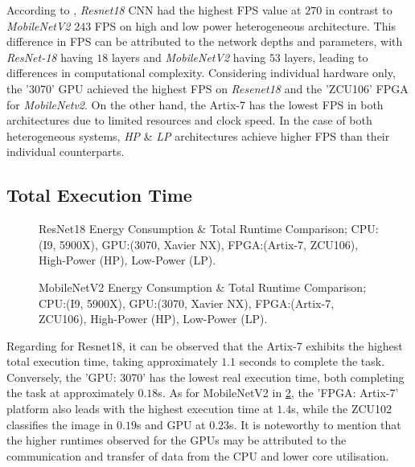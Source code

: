According to , \textit{Resnet18} CNN had the highest FPS value at $270$ in contrast to \textit{MobileNetV2} $243$ FPS on high and low power heterogeneous architecture. This difference in FPS can be attributed to the network depths and parameters, with \textit{ResNet-18} having $18$ layers and \textit{MobileNetV2} having $53$ layers, leading to differences in computational complexity. Considering individual hardware only, the '3070' GPU achieved the highest FPS on \textit{Resenet18} and the 'ZCU106' FPGA  for \textit{MobileNetv2}. On the other hand, the Artix-7 has the lowest FPS in both architectures due to limited resources and clock speed. In the case of both heterogeneous systems, \textit{HP} \& \textit{LP} architectures achieve higher FPS than their individual counterparts. 



\subsection{Total Execution Time}

\begin{figure}[t]
    \centering
\resizebox{0.9\columnwidth}{!}{}    
    \caption[ResNet18 Energy Consumption]{{ResNet18 Energy Consumption \& Total Runtime Comparison; CPU:(I9, 5900X), GPU:(3070, Xavier NX), FPGA:(Artix-7, ZCU106), High-Power (HP), Low-Power (LP).}}
    \label{fig:Resnet18PowerRuntime}
\end{figure}

\begin{figure}[t]
    \centering
\resizebox{0.9\columnwidth}{!}{}    
    \caption[MobileNetV2 Energy Consumption]{MobileNetV2 Energy Consumption \& Total Runtime Comparison; CPU:(I9, 5900X), GPU:(3070, Xavier NX), FPGA:(Artix-7, ZCU106), High-Power (HP), Low-Power (LP).}
    \label{fig:MobilenetPowerRuntime}
\end{figure}



Regarding  for Resnet18, it can be observed that the Artix-7 exhibits the highest total execution time, taking approximately $1.1$ seconds to complete the task. Conversely, the 'GPU: 3070' has the lowest real execution time, both completing the task at approximately $0.18$s. As for MobileNetV2 in \ref{fig:MobilenetPowerRuntime}, the 'FPGA: Artix-7' platform also leads with the highest execution time at $1.4$s, while the ZCU102 classifies the image in $0.19$s and GPU at $0.23$s. It is noteworthy to mention that the higher runtimes observed for the GPUs may be attributed to the communication and transfer of data from the CPU and lower core utilisation.

